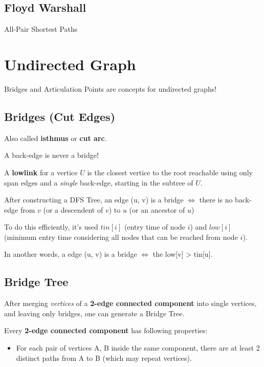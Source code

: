 	
	\subsection{Floyd Warshall}

	All-Pair Shortest Paths


\section{Undirected Graph}

	Bridges and Articulation Points are concepts for undirected graphs!
	
	\subsection{Bridges (Cut Edges)}

		Also called \textbf{isthmus} or \textbf{cut arc}.
		
		A back-edge is never a bridge!
		
		A \textbf{lowlink} for a vertice $U$ is the closest vertice to the root reachable using only span edges and a \textit{single} back-edge, starting in the subtree of $U$.
		
		After constructing a DFS Tree, an edge (u, v) is a bridge $\iff$ there is no back-edge from $v$ (or a descendent of $v$) to $u$ (or an ancestor of $u$)
		
		To do this efficiently, it's used $tin[i]$ (entry time of node $i$) and $low[i]$ (minimum entry time considering all nodes that can be reached from node $i$).
		
		In another words, a edge (u, v) is a bridge $\iff$ the low[v] > tin[u].


	\subsection{Bridge Tree}

	After merging \textit{vertices} of a \textbf{2-edge connected component} into single vertices, and leaving only bridges, one can generate a Bridge Tree.

	Every \textbf{2-edge connected component} has following properties:

    \begin{itemize}
		\item For each pair of vertices {A, B} inside the same component, there are at least 2 distinct paths from A to B (which may repeat vertices).
	\end{itemize}

